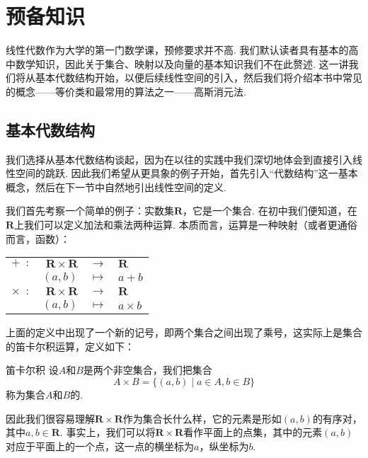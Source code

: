\chapter{预备知识}

线性代数作为大学的第一门数学课，预修要求并不高. 我们默认读者具有基本的高中数学知识，因此关于集合、映射以及向量的基本知识我们不在此赘述. 这一讲我们将从基本代数结构开始，以便后续线性空间的引入，然后我们将介绍本书中常见的概念——等价类和最常用的算法之一——高斯消元法.

\section{基本代数结构}

我们选择从基本代数结构谈起，因为在以往的实践中我们深切地体会到直接引入线性空间的跳跃. 因此我们希望从更具象的例子开始，首先引入``代数结构''这一基本概念，然后在下一节中自然地引出线性空间的定义.

我们首先考察一个简单的例子：实数集$\mathbf{R}$，它是一个集合. 在初中我们便知道，在$\mathbf{R}$上我们可以定义加法和乘法两种运算. 本质而言，运算是一种映射（或者更通俗而言，函数）：

\begin{center}
    \begin{tabular}{rrcl}
        $+\enspace\colon$      & $\mathbf{R}\times\mathbf{R}$ & $\to$     & $\mathbf{R}$ \\
                               & $(a,b)$                      & $\mapsto$ & $a+b$        \\
        $\times\enspace\colon$ & $\mathbf{R}\times\mathbf{R}$ & $\to$     & $\mathbf{R}$ \\
                               & $(a,b)$                      & $\mapsto$ & $a\times b$
    \end{tabular}
\end{center}

上面的定义中出现了一个新的记号，即两个集合之间出现了乘号，这实际上是集合的笛卡尔积运算，定义如下：

\begin{definition}{笛卡尔积}{} 
    设$A$和$B$是两个非空集合，我们把集合
    \[A\times B=\{(a,b) \mid a\in A, b\in B\}\]
    称为集合$A$和$B$的.
\end{definition}

因此我们很容易理解$\mathbf{R}\times\mathbf{R}$作为集合长什么样，它的元素是形如$(a,b)$的有序对，其中$a,b\in\mathbf{R}$. 事实上，我们可以将$\mathbf{R}\times\mathbf{R}$看作平面上的点集，其中的元素$(a,b)$对应于平面上的一个点，这一点的横坐标为$a$，纵坐标为$b$.

